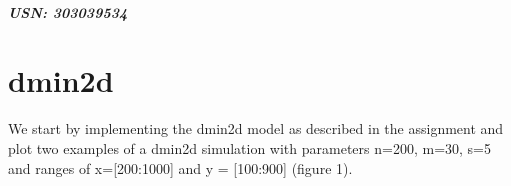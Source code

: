 \documentclass{article}
\begin{document}

\begin{center}
\textbf{\Large{}}\\
\vspace{0.8mm}
\textbf{\textit{\small{USN: 303039534}}}
\end{center}
\vspace{1.3mm}

\section{dmin2d}

We start by implementing the dmin2d model as described in the assignment and plot two examples of a dmin2d simulation with parameters n=200, m=30, s=5 and ranges of x=[200:1000] and y = [100:900] (figure 1).
\end{document}

